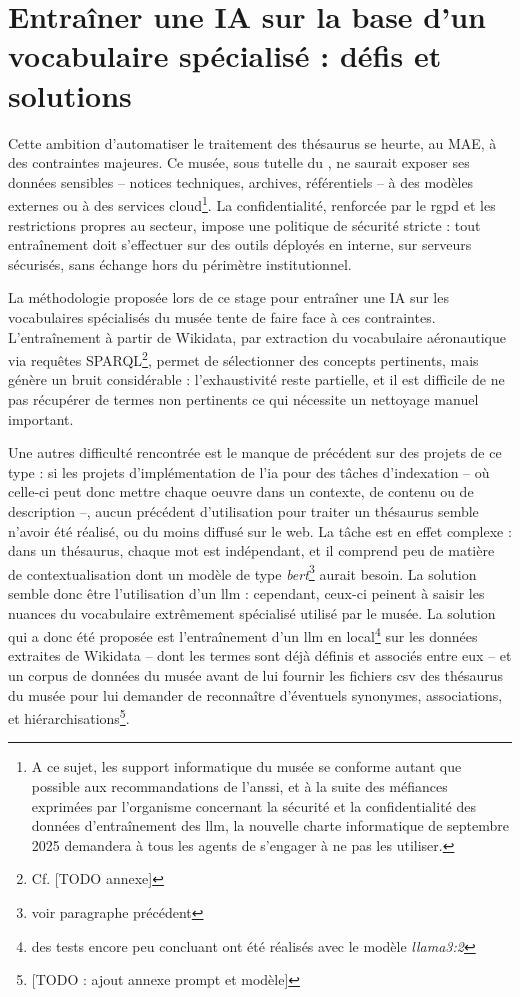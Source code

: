 \section{\label{III-C-2}Entraîner une IA sur la base d’un vocabulaire spécialisé : défis et solutions}

Cette ambition d’automatiser le traitement des thésaurus se heurte, au MAE, à des contraintes majeures. Ce musée, sous tutelle du \minarm, ne saurait exposer ses données sensibles -- notices techniques, archives, référentiels -- à des modèles externes ou à des services cloud\footnote{A ce sujet, les support informatique du musée se conforme autant que possible aux recommandations de l'\ac{anssi}, et à la suite des méfiances exprimées par l'organisme concernant la sécurité et la confidentialité des données d'entraînement des \ac{llm}, la nouvelle charte informatique de septembre 2025 demandera à tous les agents de s'engager à ne pas les utiliser.}. La confidentialité, renforcée par le \ac{rgpd} et les restrictions propres au secteur, impose une politique de sécurité stricte : tout entraînement doit s’effectuer sur des outils déployés en interne, sur serveurs sécurisés, sans échange hors du périmètre institutionnel.

La méthodologie proposée lors de ce stage pour entraîner une IA sur les vocabulaires spécialisés du musée tente de faire face à ces contraintes. L’entraînement à partir de Wikidata, par extraction du vocabulaire aéronautique via requêtes SPARQL\footnote{Cf. [TODO annexe]}, permet de sélectionner des concepts pertinents, mais génère un bruit considérable : l'exhaustivité reste partielle, et il est difficile de ne pas récupérer de termes non pertinents ce qui nécessite un nettoyage manuel important.

Une autres difficulté rencontrée est le manque de précédent sur des projets de ce type : si les projets d'implémentation de l'\ac{ia} pour des tâches d'indexation -- où celle-ci peut donc mettre chaque oeuvre dans un contexte, de contenu ou de description --, aucun précédent d'utilisation pour traiter un thésaurus semble n'avoir été réalisé, ou du moins diffusé sur le web. La tâche est en effet complexe : dans un thésaurus, chaque mot est indépendant, et il comprend peu de matière de contextualisation dont un modèle de type \textit{bert}\footnote{voir paragraphe précédent} aurait besoin. La solution semble donc être l'utilisation d'un \ac{llm} : cependant, ceux-ci peinent à saisir les nuances du vocabulaire extrêmement spécialisé utilisé par le musée. La solution qui a donc été proposée est l'entraînement d'un \ac{llm} en local\footnote{des tests encore peu concluant ont été réalisés avec le modèle \textit{llama3:2}} sur les données extraites de Wikidata -- dont les termes sont déjà définis et associés entre eux -- et un corpus de données du musée avant de lui fournir les fichiers csv des thésaurus du musée pour lui demander de reconnaître d'éventuels synonymes, associations, et hiérarchisations\footnote{[TODO : ajout annexe prompt et modèle]}. 

